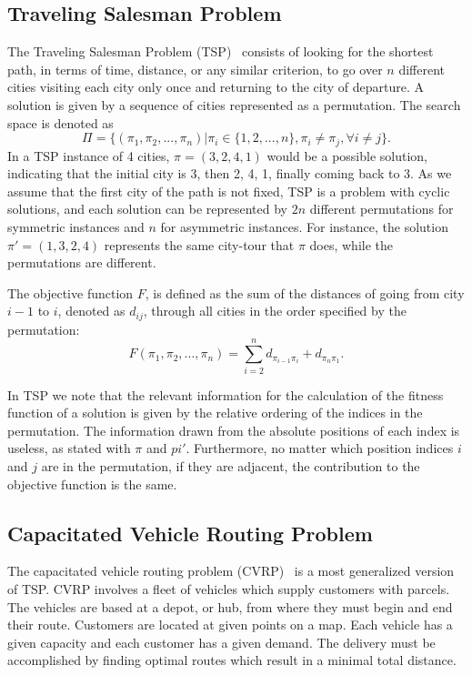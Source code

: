 \subsection{Traveling Salesman Problem}
The Traveling Salesman Problem (TSP)~\citep{goldberg1985alleles} consists of looking for the shortest path, in terms of time, distance, or any similar criterion, to go over $n$ different cities visiting each city only once and returning to the city of departure. A solution is given by a sequence of cities represented as a permutation. The search space is denoted as
\begin{equation*}
	\Pi = \{ (\pi_1, \pi_2,...,\pi_n) | \pi_i \in \{ 1,2,...,n \}, \pi_i \neq \pi_j, \forall i \neq j \}\text{.}
\end{equation*}
In a TSP instance of 4 cities, $\pi = (3,2,4,1)$ would be a possible solution, indicating that the initial city is 3, then 2, 4, 1, finally coming back to 3. As we assume that the first city of the path is not fixed, TSP is a problem with cyclic solutions, and each solution can be represented by $2n$ different permutations for symmetric instances and $n$ for asymmetric instances. For instance, the solution ${\pi}'=(1,3,2,4)$ represents the same city-tour that $\pi$ does, while the permutations are different.

The objective function $F$, is defined as the sum of the distances of going from city $i-1$ to $i$, denoted as $d_{ij}$, through all cities in the order specified by the permutation:
\begin{equation*}
	F(\pi_1, \pi_2, ... , \pi_n) = \sum_{i=2}^{n}{d_{\pi_{i-1}\pi_i}} + d_{\pi_n\pi_1} \text{.}
\end{equation*}

In TSP we note that the relevant information for the calculation of the fitness function of a solution is given by the relative ordering of the indices in the permutation. The information drawn from the absolute positions of each index is useless, as stated with $\pi$ and ${pi}'$. Furthermore, no matter which position indices $i$ and $j$ are in the permutation, if they are adjacent, the contribution to the objective function is the same.

\subsection{Capacitated Vehicle Routing Problem}
\label{section:cvrp}
The capacitated vehicle routing problem (CVRP)~\citep{toth2001vehicle} is a most generalized version of TSP. CVRP involves a fleet of vehicles which supply customers with parcels. The vehicles are based at a depot, or hub, from where they must begin and end their route. Customers are located at given points on a map. Each vehicle has a given capacity and each customer has a given demand. The delivery must be accomplished by finding optimal routes which result in a minimal total distance.

